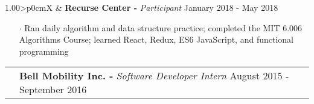 \documentclass[a4paper, oneside, final]{scrartcl} %
\newcommand{\gray}{\rowcolor[gray]{.90}} %
\begin{document}
\begin{center}
  \vspace{-0.2cm}

  \begin{tabularx}{1.00\linewidth}{>{\raggedleft\scshape}p{0cm}X}
    \gray& \textbf{Recurse Center -} \textit{Participant} \hfill {January 2018 - May 2018}\\
  \end{tabularx}
  \vspace{-0.5cm}
  \begin{itemize} \itemsep-0.2cm
      \vspace{-0.1cm}

    \item[$\cdot$] Ran daily algorithm and data structure practice; completed the MIT 6.006 Algorithms Course; learned React, Redux, ES6 JavaScript, and functional programming
  \end{itemize}

  \vspace{-0.2cm}

  \begin{tabularx}{1.00\linewidth}{>{\raggedleft\scshape}p{0cm}X}
    \gray& \textbf{Bell Mobility Inc. -} \textit{Software Developer Intern} \hfill {August 2015 - September 2016}\\
  \end{tabularx}
  \vspace{-0.5cm}
  \begin{itemize}\itemsep-0.2cm
      \vspace{-0.1cm}


\end{itemize}
\end{center}
\end{document}
